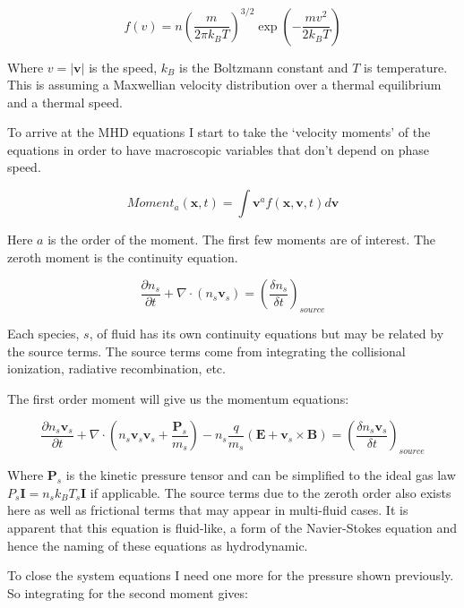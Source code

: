 \documentclass[12pt,upcase]{umlthesis}
\begin{document}
\begin{equation}
	f(v) = n {(\frac{m}{2\pi k_B T})}^{3/2} \exp{(-\frac{mv^2}{2k_B T})}
\end{equation}

Where $v = |\textbf{v}|$ is the speed, $k_B$ is the Boltzmann constant and $T$ is temperature. This is assuming a Maxwellian velocity distribution over a thermal equilibrium and a thermal speed.

To arrive at the MHD equations I start to take the `velocity moments' of the equations in order to have macroscopic variables that don't depend on phase speed.

\begin{equation}
	{Moment}_a(\textbf{x}, t) = \int{\textbf{v}^a f(\textbf{x}, \textbf{v}, t)}d\textbf{v}
\end{equation}

Here $a$ is the order of the moment. The first few moments are of interest. The zeroth moment is the continuity equation.

\begin{equation}\label{eq:continuityequation}
	\frac{\partial n_s}{\partial t} + \nabla \cdot (n_s \textbf{v}_s) = {(\frac{\delta n_s}{\delta t})}_{source}
\end{equation}

Each species, $s$, of fluid has its own continuity equations but may be related by the source terms. The source terms come from integrating the collisional ionization, radiative recombination, etc.

The first order moment will give us the momentum equations:

\begin{equation}\label{eq:momentumequation}
	\frac{\partial n_s \textbf{v}_s}{\partial t} + \nabla \cdot (n_s \textbf{v}_s \textbf{v}_s + \frac{\textbf{P}_s}{m_s} ) -n_s \frac{q}{m_s}(\textbf{E} + \textbf{v}_s \times \textbf{B}) = {(\frac{\delta n_s \textbf{v}_s}{\delta t})}_{source}
\end{equation}

Where $\textbf{P}_s$ is the kinetic pressure tensor and can be simplified to the ideal gas law $P_s\textbf{I} = n_s k_B T_s \textbf{I}$ if applicable. The source terms due to the zeroth order also exists here as well as frictional terms that may appear in multi-fluid cases. It is apparent that this equation is fluid-like, a form of the Navier-Stokes equation and hence the naming of these equations as hydrodynamic.

To close the system equations I need one more for the pressure shown previously. So integrating for the second moment gives:
\end{document}
